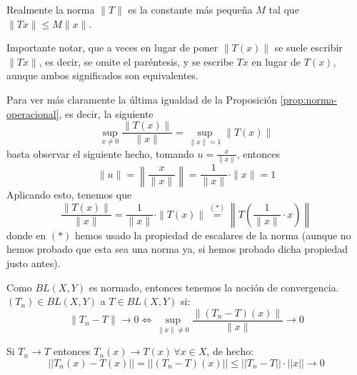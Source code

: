 \begin{observacion}
    Realmente la norma $\|T\|$ es la constante más pequeña $M$ tal que $\|Tx\| \leq M\|x\|$.
\end{observacion}

\begin{notacion}
    Importante notar, que a veces en lugar de poner $\|T(x)\|$ se suele escribir $\|Tx\|$, es decir, se omite el paréntesis, y se escribe $Tx$ en lugar de $T(x)$, aunque ambos significados son equivalentes.
\end{notacion}

\begin{observacion}
    Para ver más claramente la última igualdad de la Proposición \ref{prop:norma-operacional}, es decir, la siguiente
    \begin{equation*}
        \sup_{x \neq 0} \frac{\|T(x)\|}{\|x\|} = \sup_{\|x\|=1} \|T(x)\|
    \end{equation*}
    basta observar el siguiente hecho, tomando $u = \frac{x}{\|x\|}$, entonces 
    \begin{equation*}
        \|u\| = \left\| \frac{x}{\|x\|} \right\| = \frac{1}{\|x\|} \cdot \|x\| = 1
    \end{equation*}
    Aplicando esto, tenemos que 
    $$\frac{\|T(x)\|}{\|x\|} = \frac{1}{\|x\|} \cdot \|T(x)\| \overset{(*)}{=} \left\| T \left( \frac{1}{\|x\|} \cdot x \right) \right\|$$
    donde en $(*)$ hemos usado la propiedad de escalares de la norma (aunque no hemos probado que esta sea una norma ya, si hemos probado dicha propiedad justo antes).
\end{observacion}    

\begin{definicion}
    Como $BL(X, Y)$ es normado, entonces tenemos la noción de convergencia. $(T_n) \in BL(X, Y)$  a $T \in BL(X, Y)$ si:
    \begin{equation*}
        \|T_n - T\| \to 0 \iff \sup_{\|x\|\neq 0} \dfrac{\|(T_n - T)(x)\|}{\|x\|} \to 0
    \end{equation*}
\end{definicion}

\begin{observacion}
    Si $T_n \to T$ entonces $T_n(x) \to T(x) \, \forall x \in X$, de hecho:
    \begin{equation*}
        ||T_n(x) - T(x)|| = ||(T_n - T)(x)|| \le ||T_n - T|| \cdot ||x|| \to 0
    \end{equation*}
\end{observacion}

